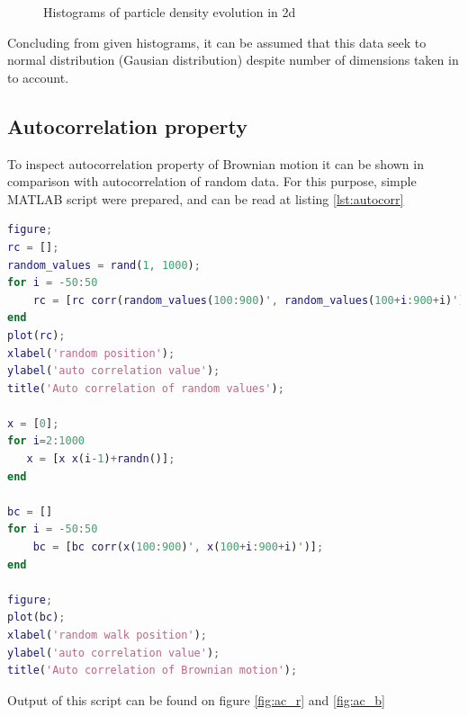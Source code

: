 \documentclass[onecolumn]{article}
\begin{document}
\begin{figure}[H]
\noindent{}
\caption{Histograms of particle density evolution in 2d}
\label{fig:hist_2d}
\end{figure}

Concluding from given histograms, it can be assumed that this data seek to normal distribution (Gausian distribution) despite number of dimensions taken in to account. 


\subsection{Autocorrelation property}

To inspect autocorrelation property of Brownian motion it can be shown in comparison with autocorrelation of random data. For this purpose, simple MATLAB script were prepared, and can be read at listing \ref{lst:autocorr}

\begin{lstlisting}[language=Matlab,frame=single,label={lst:autocorr},breaklines=true,caption={Script that outputs autocorrelation for Brownian motion and random vector of data}]
figure;
rc = [];
random_values = rand(1, 1000);
for i = -50:50
    rc = [rc corr(random_values(100:900)', random_values(100+i:900+i)')];
end
plot(rc);
xlabel('random position');
ylabel('auto correlation value');
title('Auto correlation of random values');

x = [0];
for i=2:1000
   x = [x x(i-1)+randn()];
end

bc = []
for i = -50:50
    bc = [bc corr(x(100:900)', x(100+i:900+i)')];
end

figure;
plot(bc);
xlabel('random walk position');
ylabel('auto correlation value');
title('Auto correlation of Brownian motion');
\end{lstlisting}
\vspace{1em}
Output of this script can be found on figure \ref{fig:ac_r} and \ref{fig:ac_b}
\end{document}
